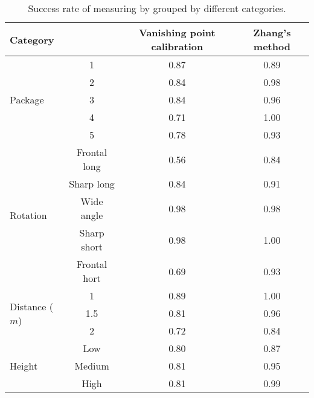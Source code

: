 \begin{table}%
\centering
\begin{tabular}{lccc}
\toprule
\multicolumn{2}{l}{Category} & Vanishing point calibration & Zhang's method\\
\midrule

\multirow{5}{*}{Package} 
& 1 & 0.87 & 0.89 \\
& 2 & 0.84 & 0.98 \\
& 3 & 0.84 & 0.96 \\
& 4 & 0.71 & 1.00 \\
& 5 & 0.78 & 0.93 \\
\midrule

\multirow{5}{*}{Rotation}
& Frontal long		& 0.56 &  0.84 \\ 
& Sharp long		& 0.84 &  0.91 \\
& Wide angle 		& 0.98 &  0.98 \\
& Sharp short 		& 0.98 &  1.00 \\
& Frontal hort		& 0.69 &  0.93 \\
\midrule
\multirow{3}{*}{Distance ($m$)} 
& 1 			& 0.89 & 1.00   \\
& 1.5  			& 0.81 & 0.96   \\
& 2 			& 0.72 & 0.84   \\
\midrule
\multirow{3}{*}{Height} 
& Low 		& 0.80 & 0.87  \\
& Medium 	& 0.81 & 0.95  \\
& High		& 0.81 & 0.99  \\
\bottomrule
 \end{tabular}
 \caption{Success rate of measuring by grouped by different categories.}
\label{table:measuring_categories}
\end{table}